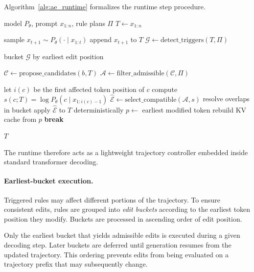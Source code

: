 \documentclass[twocolumn]{article}
\begin{document}
Algorithm~\ref{alg:ae_runtime} formalizes the runtime step procedure.

\begin{algorithm}[!htbp]
  \caption{Answer Engineering Runtime Decoding}\label{alg:ae_runtime}

  \small

  \begin{algorithmic}[1]
    \Require model $P_\theta$, prompt $x_{1:n}$, rule plans $\Pi$ \State $T
    \gets x_{1:n}$

     \State sample $x_{t+1}\sim
    P_\theta(\cdot\mid x_{1:t})$ \State append $x_{t+1}$ to $T$ \State
    $\mathcal{G}\gets\mathrm{detect\_triggers}(T,\Pi)$

     \State bucket $\mathcal{G}$ by earliest edit
    position

     \State
    $\mathcal{C}\gets\mathrm{propose\_candidates}(b,T)$ \State
    $\mathcal{A}\gets\mathrm{filter\_admissible}(\mathcal{C},\Pi)$

     \State let $i(c)$ be the first affected token position of $c$
    \State compute $s(c;T)=\log P_\theta(c\mid x_{1:i(c)-1})$ \State $\hat{\mathcal{E}}\gets
    \mathrm{select\_compatible}(\mathcal{A},s)$ \State resolve overlaps in
    bucket \State apply $\hat{\mathcal{E}}$ to $T$ deterministically \State $p
    \gets$ earliest modified token \State rebuild KV cache from $p$ \State
    \textbf{break} \EndIf \EndFor \EndIf \EndWhile

    \State \Return $T$
  \end{algorithmic}
\end{algorithm}

The runtime therefore acts as a lightweight trajectory controller embedded
inside standard transformer decoding.

\paragraph{Earliest-bucket execution.}

Triggered rules may affect different portions of the trajectory. To ensure
consistent edits, rules are grouped into \emph{edit buckets} according to the
earliest token position they modify. Buckets are processed in ascending order of
edit position.

Only the earliest bucket that yields admissible edits is executed during a given
decoding step. Later buckets are deferred until generation resumes from the
updated trajectory. This ordering prevents edits from being evaluated on a
trajectory prefix that may subsequently change.
\end{document}
